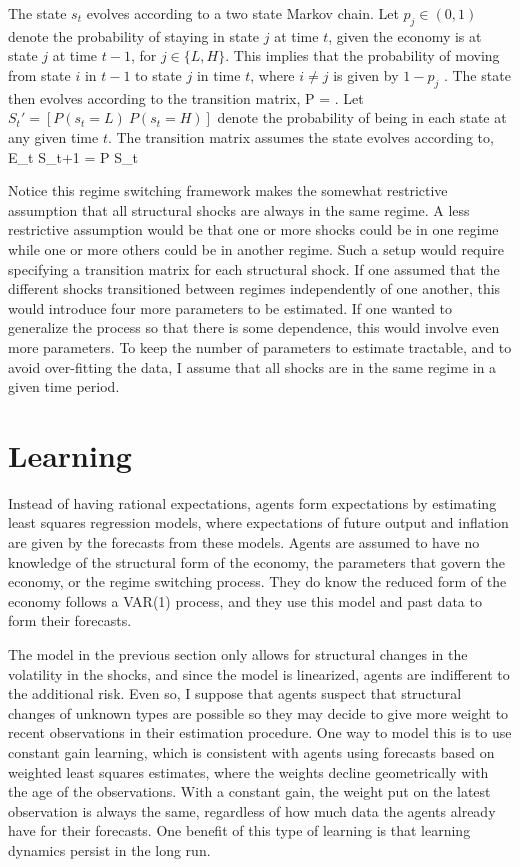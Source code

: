 The state $s_t$ evolves according to a two state Markov chain.  Let $p_j \in (0,1)$ denote the probability of staying in state $j$ at time $t$, given the economy is at state $j$ at time $t-1$, for $j \in \{L,H\}$.  This implies that the probability of moving from state $i$ in $t-1$ to state $j$ in time $t$, where $i\neq j$ is given by $1-p_j$ .  The state then evolves according to the transition matrix,
\beq \label{eq3:tran} P = \left[ \begin{array}{cc} p_L & 1-p_L \\ 1-p_H & p_H \end{array} \right]. \eeq
Let $S_t' = [P(s_t=L)~ P(s_t=H)]$ denote the probability of being in each state at any given time $t$.  The transition matrix assumes the state evolves according to,
\beq \label{eq3:tranevo} E_t S_{t+1} = P S_{t} \eeq

Notice this regime switching framework makes the somewhat restrictive assumption that all structural shocks are always in the same regime.  A less restrictive assumption would be that one or more shocks could be in one regime while one or more others could be in another regime.  Such a setup would require specifying a transition matrix for each structural shock.  If one assumed that the different shocks transitioned between regimes independently of one another, this would introduce four more parameters to be estimated.  If one wanted to generalize the process so that there is some dependence, this would involve even more parameters.  To keep the number of parameters to estimate tractable, and to avoid over-fitting the data, I assume that all shocks are in the same regime in a given time period.

\section{Learning}
Instead of having rational expectations, agents form expectations by estimating least squares regression models, where expectations of future output and inflation are given by the forecasts from these models.  Agents are assumed to have no knowledge of the structural form of the economy, the parameters that govern the economy, or the regime switching process.  They do know the reduced form of the economy follows a VAR(1) process, and they use this model and past data to form their forecasts. 

The model in the previous section only allows for structural changes in the volatility in the shocks, and since the model is linearized, agents are indifferent to the additional risk.  Even so, I suppose that agents suspect that structural changes of unknown types are possible so they may decide to give more weight to recent observations in their estimation procedure.  One way to model this is to use constant gain learning, which is consistent with agents using forecasts based on weighted least squares estimates, where the weights decline geometrically with the age of the observations.  With a constant gain, the weight put on the latest observation is always the same, regardless of how much data the agents already have for their forecasts.  One benefit of this type of learning is that learning dynamics persist in the long run.  

